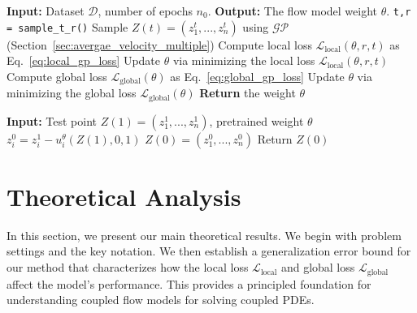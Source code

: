 \documentclass{article}
\begin{document}
\begin{algorithm}
\caption{Training Algorithm with GP modeling}
\label{alg:training}
\begin{algorithmic}[1]
\STATE \textbf{Input:} Dataset $\mathcal{D}$, number of epochs $n_0$.
\STATE \textbf{Output:} The flow model weight $\theta$.
    \STATE  \texttt{t,r = sample\_t\_r()}
    \STATE Sample $Z(t) = (z^t_1,...,z^t_n)$ using $\mathcal{GP}$ (Section~\ref{sec:avergae_velocity_multiple}) 
    \STATE Compute local loss $\mathcal{L}_{\text{local}}(\theta,r,t)$ as Eq.~\ref{eq:local_gp_loss}
    \STATE Update $\theta$ via minimizing the local loss $\mathcal{L}_{\text{local}}(\theta,r,t)$
    \STATE Compute global loss $\mathcal{L}_{\text{global}}(\theta)$ as Eq.~\ref{eq:global_gp_loss}
    \STATE Update $\theta$ via minimizing the global loss $\mathcal{L}_{\text{global}}(\theta)$
\ENDFOR
\STATE \textbf{Return} the weight $\theta$
\end{algorithmic}
\end{algorithm}

\begin{algorithm}
\caption{One-Step Sampling Algorithm}
\label{alg:sampling}
\begin{algorithmic}[1]
\STATE \textbf{Input:} Test point $Z(1) = (z^1_1, ..., z^1_n)$, pretrained weight $\theta$
   \STATE $z^0_i = z^1_i - u^{\theta}_{i}(Z(1),0,1)$
\ENDFOR
\STATE $Z(0) = (z^0_1, ..., z^0_n)$
\STATE Return $Z(0)$
\end{algorithmic}
\end{algorithm}


\section{Theoretical Analysis}
In this section, we present our main theoretical results. We begin with problem settings and the key notation. We then establish a generalization error bound for our method that characterizes how the local loss $\mathcal{L}_{\text{local}}$ and global loss $\mathcal{L}_{\text{global}}$ affect the model's performance. This provides a principled foundation for understanding coupled flow models for solving coupled PDEs.
\end{document}
